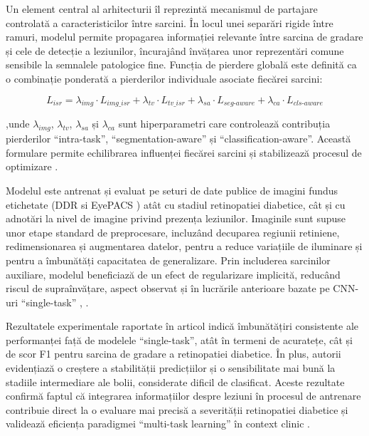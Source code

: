 \documentclass[12pt, a4paper, oneside, romanian]{teza-upb}
\begin{document}
Un element central al arhitecturii îl reprezintă mecanismul de partajare controlată a
caracteristicilor între sarcini. În locul unei separări rigide între ramuri, modelul permite propagarea
informației relevante între sarcina de gradare și cele de detecție a leziunilor, încurajând învățarea unor
reprezentări comune sensibile la semnalele patologice fine. Funcția de pierdere globală este definită ca o
combinație ponderată a pierderilor individuale asociate fiecărei sarcini:

$$L_{isr} = \lambda_{img} \cdot L_{img\_isr} + \lambda_{tv} \cdot L_{tv\_isr} + \lambda_{sa} \cdot L_{seg\text{-}aware} + \lambda_{ca} \cdot L_{cls\text{-}aware}$$
\bigskip

,unde $\lambda_{img}$, $\lambda_{tv}$, $\lambda_{sa}$ și $\lambda_{ca}$ sunt hiperparametri care controlează 
contribuția pierderilor ``intra-task'', ``segmentation-aware'' și ``classification-aware''. Această formulare permite echilibrarea
influenței fiecărei sarcini și stabilizează procesul de optimizare \cite{6_wang2021deep}.

Modelul este antrenat și evaluat pe seturi de date publice de imagini fundus etichetate (DDR
\cite{15_li2019diagnostic} si EyePACS \cite{9_chetoui2020explainable}) atât cu stadiul retinopatiei diabetice, cât și cu adnotări la nivel de imagine privind
prezența leziunilor. Imaginile sunt supuse unor etape standard de preprocesare, incluzând decuparea
regiunii retiniene, redimensionarea și augmentarea datelor, pentru a reduce variațiile de iluminare și
pentru a îmbunătăți capacitatea de generalizare. Prin includerea sarcinilor auxiliare, modelul beneficiază
de un efect de regularizare implicită, reducând riscul de supraînvățare, aspect observat și în lucrările
anterioare bazate pe CNN-uri “single-task” \cite{3_gulshan2016development}, \cite{4_pratt2016convolutional}.
\bigskip

Rezultatele experimentale raportate în articol indică îmbunătățiri consistente ale performanței
față de modelele “single-task”, atât în termeni de acuratețe, cât și de scor F1 pentru sarcina de gradare a
retinopatiei diabetice. În plus, autorii evidențiază o creștere a stabilității predicțiilor și o sensibilitate mai
bună la stadiile intermediare ale bolii, considerate dificil de clasificat. Aceste rezultate confirmă faptul că
integrarea informațiilor despre leziuni în procesul de antrenare contribuie direct la o evaluare mai
precisă a severității retinopatiei diabetice și validează eficiența paradigmei “multi-task learning” în
context clinic \cite{6_wang2021deep}.
\bigskip
\end{document}
